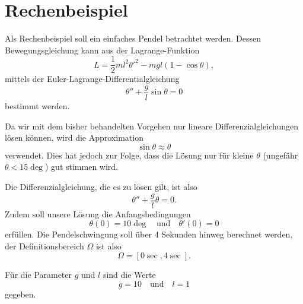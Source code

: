 %
%
%
%
\section{Rechenbeispiel\label{fem:rechenbsp}}

Als Rechenbeispiel soll ein einfaches Pendel betrachtet werden. 
Dessen Bewegungsgleichung kann aus der Lagrange-Funktion
\begin{equation}
    L = \frac{1}{2} m l^2 {\theta'}^2 - m g l (1 - \cos \theta),
\end{equation}
mittels der Euler-Lagrange-Differentialgleichung
\begin{equation}
    \theta'' + \frac{g}{l} \sin \theta = 0
\end{equation}
bestimmt werden.

Da wir mit dem bisher behandelten Vorgehen nur lineare Differenzialgleichungen lösen können, wird die Approximation
\begin{equation}
    \sin \theta \approx \theta
\end{equation}
verwendet.
Dies hat jedoch zur Folge, dass die Lösung nur für kleine $\theta$ (ungefähr $\theta < 15 \deg$) gut stimmen wird.

Die Differenzialgleichung, die es zu lösen gilt, ist also
\begin{equation}
    \theta'' + \frac{g}{l} \theta = 0.
\end{equation}
Zudem soll unsere Lösung die Anfangsbedingungen
\begin{equation}
    \theta(0) = 10 \deg
    \quad \text{und} \quad
    \theta'(0) = 0
\end{equation}
erfüllen.
Die Pendelschwingung soll über 4 Sekunden hinweg berechnet werden, der Definitionsbereich $\Omega$ ist also
\begin{equation}
    \Omega = [0\sec, 4\sec].
\end{equation}

Für die Parameter $g$ und $l$ sind die Werte
\begin{equation}
    g = 10
    \quad \text{und} \quad
    l = 1
\end{equation}
gegeben.


